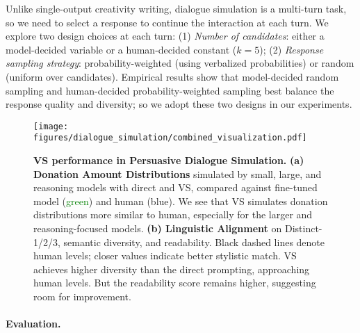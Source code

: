 Unlike single-output creativity writing, dialogue simulation is a multi-turn task, so we need to select a response to continue the interaction at each turn. 
We explore two design choices at each turn: (1) \textit{Number of candidates}: either a model-decided variable or a human-decided constant ($k=5$); (2) \textit{Response sampling strategy}: probability-weighted (using verbalized probabilities) or random (uniform over candidates). Empirical results show that model-decided random sampling and human-decided probability-weighted sampling best balance the response quality and diversity; so we adopt these two designs in our experiments. %



\begin{figure*}[t] %
    \centering
    \texttt{[image: figures/dialogue\_simulation/combined\_visualization.pdf]}
    \caption{\textbf{VS performance in Persuasive Dialogue Simulation.}
    \textbf{(a) Donation Amount Distributions} simulated by small, large, and reasoning models with direct and VS, compared against fine-tuned model (\textcolor{Green}{green}) and human (\textcolor{ProcessBlue}{blue}). 
    We see that VS simulates donation distributions more similar to human, especially for the larger and reasoning-focused models. 
    \textbf{(b)  Linguistic Alignment} on Distinct-1/2/3, semantic diversity, and readability. Black dashed lines denote human levels; closer values indicate better stylistic match.
    VS achieves higher diversity than the direct prompting, approaching human levels. But the readability score remains higher, suggesting room for improvement.     
    \vspace{-1em}
    }
    \label{fig:dialogue_simulation_combined_performance}
\end{figure*}



\paragraph{Evaluation.} 

